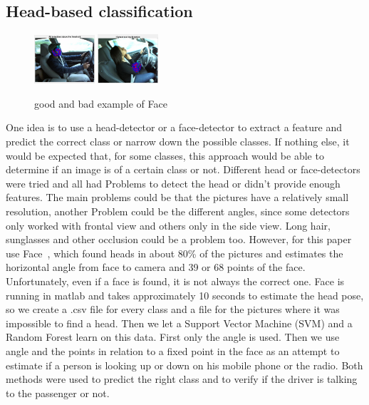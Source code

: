 \documentclass[10pt,twocolumn,letterpaper]{article}
\begin{document}
\subsection{Head-based classification}
\begin{figure}[h]
	\centering
	\includegraphics[width=0.2\textwidth]{face1}\hspace{0.01\textwidth}
	\includegraphics[width=0.2\textwidth]{faces/face7}\\ \vspace{0.01\textwidth}
	\caption{good and bad example of Face}
	\label{face_estimation_example}
\end{figure}
One idea is to use a head-detector or a face-detector to extract a feature and predict the correct class or narrow down the possible classes. If nothing else, it would be expected that, for some classes, this approach would be able to determine if an image is of a certain class or not. Different head or face-detectors were tried and all had Problems to detect the head or didn't provide enough features. The main problems could be that the pictures have a relatively small resolution, another Problem could be the different angles, since some detectors only worked with frontal view and others only in the side view. Long hair, sunglasses and other occlusion could be a problem too. However, for this paper use Face~\cite{Ramanan:2012:FDP:2354409.2355119}, which found heads in about 80\% of the pictures and estimates the horizontal angle from face to camera and 39 or 68 points of the face. Unfortunately, even if a face is found, it is not always the correct one. Face is running in matlab and takes approximately 10 seconds to estimate the head pose, so we create a .csv file for every class and a file for the pictures where it was impossible to find a head. Then we let a Support Vector Machine (SVM) and a Random Forest learn on this data. First only  the angle is used. Then we use angle and the points in relation to a fixed point in the face as an attempt to estimate if a person is looking up or down on his mobile phone or the radio. Both methods were used to predict the right class and to verify if the driver is talking to the passenger or not.
\end{document}
